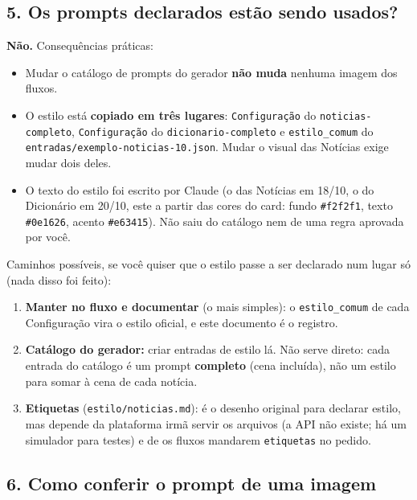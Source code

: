 \subsection*{5. Os prompts declarados estão sendo usados?}

\textbf{Não.} Consequências práticas:

\begin{itemize}
\item 
Mudar o catálogo de prompts do gerador \textbf{não muda} nenhuma imagem dos fluxos.


\item 
O estilo está \textbf{copiado em três lugares}: \texttt{Configuração} do \nolinkurl{noticias-completo}, \texttt{Configuração} do \nolinkurl{dicionario-completo} e \nolinkurl{estilo_comum} do \nolinkurl{entradas/exemplo-noticias-10.json}. Mudar o visual das Notícias exige mudar dois deles.


\item 
O texto do estilo foi escrito por Claude (o das Notícias em 18/10, o do Dicionário em 20/10, este a partir das cores do card: fundo \texttt{\#f2f2f1}, texto \texttt{\#0e1626}, acento \texttt{\#e63415}). Não saiu do catálogo nem de uma regra aprovada por você.


\end{itemize}

Caminhos possíveis, se você quiser que o estilo passe a ser declarado num lugar só (nada disso foi feito):

\begin{enumerate}
\item 
\textbf{Manter no fluxo e documentar} (o mais simples): o \nolinkurl{estilo_comum} de cada Configuração vira o estilo oficial, e este documento é o registro.


\item 
\textbf{Catálogo do gerador:} criar entradas de estilo lá. Não serve direto: cada entrada do catálogo é um prompt \textbf{completo} (cena incluída), não um estilo para somar à cena de cada notícia.


\item 
\textbf{Etiquetas} (\nolinkurl{estilo/noticias.md}): é o desenho original para declarar estilo, mas depende da plataforma irmã servir os arquivos (a API não existe; há um simulador para testes) e de os fluxos mandarem \texttt{etiquetas} no pedido.


\end{enumerate}

\subsection*{6. Como conferir o prompt de uma imagem}

